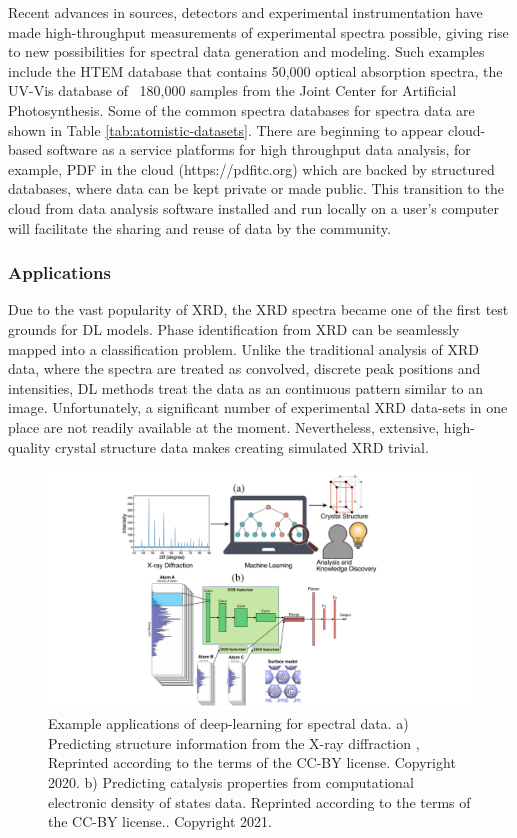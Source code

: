 \documentclass[pdflatex,sn-mathphys]{sn-jnl}%
\theoremstyle{thmstyleone}%
\theoremstyle{thmstyletwo}%
\theoremstyle{thmstylethree}%
\begin{document}
Recent advances in sources, detectors and experimental instrumentation have made high-throughput measurements of experimental spectra possible, giving rise to new possibilities for spectral data generation and modeling. Such examples include the HTEM database \cite{zakutayev2018open} that contains 50,000 optical absorption spectra, the UV-Vis database of ~180,000 samples from the Joint Center for Artificial Photosynthesis.  Some of the common spectra databases for spectra data are shown in Table \ref{tab:atomistic-datasets}.  There are beginning to appear cloud-based software as a service platforms for high throughput data analysis, for example, PDF in the cloud (https://pdfitc.org) \cite{yang;aca21} which are backed by structured databases, where data can be kept private or made public.  This transition to the cloud from data analysis software installed and run locally on a user's computer will facilitate the sharing and reuse of data by the community.





\subsubsection{Applications}
Due to the vast popularity of XRD, the XRD spectra became one of the first test grounds for DL models. Phase identification from XRD can be seamlessly mapped into a classification problem. Unlike the traditional analysis of XRD data, where the spectra are treated as convolved, discrete peak positions and intensities, DL methods treat the data as an continuous pattern similar to an image. Unfortunately, a significant number of experimental XRD data-sets in one place are not readily available at the moment. Nevertheless, extensive, high-quality crystal structure data makes creating simulated XRD trivial.

\begin{figure}
    \centering
    \includegraphics[width=1.0\textwidth]{Figures/Fig3.pdf}
    \caption{Example applications of deep-learning for spectral data. a) Predicting structure information from the X-ray diffraction \cite{suzukiSymmetryPredictionKnowledge2020},  Reprinted according to the terms of the CC-BY license.\cite{suzukiSymmetryPredictionKnowledge2020} Copyright 2020. b) Predicting catalysis properties from computational electronic density of states data. Reprinted according to the terms of the CC-BY license.\cite{fungMachineLearnedFeatures2021}. Copyright 2021.}
    \label{fig:spectra_model}
\end{figure}
\end{document}
